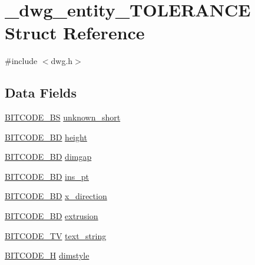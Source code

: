 \hypertarget{struct__dwg__entity__TOLERANCE}{\section{\-\_\-dwg\-\_\-entity\-\_\-\-T\-O\-L\-E\-R\-A\-N\-C\-E \-Struct \-Reference}
\label{struct__dwg__entity__TOLERANCE}
}


{\ttfamily \#include $<$dwg.\-h$>$}

\subsection*{\-Data \-Fields}
\begin{DoxyCompactItemize}
\item 
\hyperlink{dwg_8h_a94297606fbd4a4ff97e8add284af0809}{\-B\-I\-T\-C\-O\-D\-E\-\_\-\-B\-S} \hyperlink{struct__dwg__entity__TOLERANCE_a7925d91c6cc7bf5e7f62690ab473d4e4}{unknown\-\_\-short}
\item 
\hyperlink{dwg_8h_a3c1e6781466b74ba07785d57da70ed97}{\-B\-I\-T\-C\-O\-D\-E\-\_\-\-B\-D} \hyperlink{struct__dwg__entity__TOLERANCE_a5ddb1201d4db89aa896f19ceba15e74f}{height}
\item 
\hyperlink{dwg_8h_a3c1e6781466b74ba07785d57da70ed97}{\-B\-I\-T\-C\-O\-D\-E\-\_\-\-B\-D} \hyperlink{struct__dwg__entity__TOLERANCE_a5d83d3db424c349f05193f998fe1ebd1}{dimgap}
\item 
\hyperlink{dwg_8h_a00698ef1bb072aa0a9360c6fc1c57587}{\-B\-I\-T\-C\-O\-D\-E\-\_\-B\-D} \hyperlink{struct__dwg__entity__TOLERANCE_a4f32343cbbf6f28329b1c9dfd7eaf837}{ins\-\_\-pt}
\item 
\hyperlink{dwg_8h_a00698ef1bb072aa0a9360c6fc1c57587}{\-B\-I\-T\-C\-O\-D\-E\-\_\-B\-D} \hyperlink{struct__dwg__entity__TOLERANCE_a0cb87d726bd67cc1502267dd2379a485}{x\-\_\-direction}
\item 
\hyperlink{dwg_8h_a00698ef1bb072aa0a9360c6fc1c57587}{\-B\-I\-T\-C\-O\-D\-E\-\_\-B\-D} \hyperlink{struct__dwg__entity__TOLERANCE_ab26263e801e630519baf5e8fc61abb6f}{extrusion}
\item 
\hyperlink{dwg_8h_a2a7e040c6e36ca039b03608679ecaf7c}{\-B\-I\-T\-C\-O\-D\-E\-\_\-\-T\-V} \hyperlink{struct__dwg__entity__TOLERANCE_aeaedfb021c3d93d6a28114dcfbdfb6ee}{text\-\_\-string}
\item 
\hyperlink{dwg_8h_a7c700e94e047a97ba8c24bdfe4029dc3}{\-B\-I\-T\-C\-O\-D\-E\-\_\-\-H} \hyperlink{struct__dwg__entity__TOLERANCE_ac23f73a3756c62d8e71052e48ffe9eb2}{dimstyle}
\end{DoxyCompactItemize}


